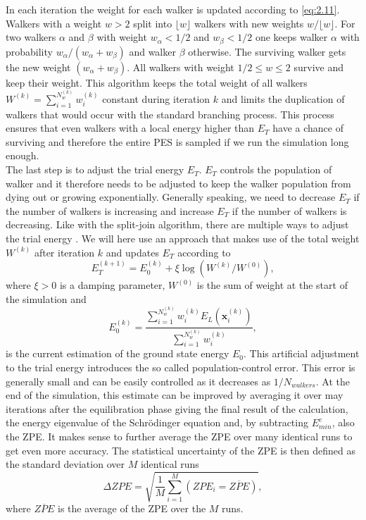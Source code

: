 \documentclass [12pt]{report}
\begin{document}
 In each iteration the weight for each walker is updated according to \eqref{eq:2.11}. Walkers with a weight $w > 2$ split into $\lfloor w \rfloor$ walkers with new weights $w/\lfloor w \rfloor$. For two walkers $\alpha$ and $\beta$ with weight $w_\alpha < 1/2$ and $w_\beta < 1/2$ one keeps walker $\alpha$  with probability $w_\alpha/(w_\alpha + w_\beta)$ and walker $\beta$ otherwise. The surviving walker gets the new weight $(w_\alpha + w_\beta)$. All walkers with weight $1/2 \leq w \leq 2$ survive and keep their weight. This algorithm keeps the total weight of all walkers $W^{(k)} =  \sum_{i = 1}^{N_w^{(k)}} w_i^{(k)}$ constant during iteration $k$ and limits the duplication of walkers that would occur with the standard branching process.
 This process ensures that even walkers with a local energy higher than $E_T$ have a chance of surviving and therefore the entire PES is sampled if we run the simulation long enough. \\
The last step is to adjust the trial energy $E_T$. $E_T$ controls the population of walker and it therefore needs to be adjusted to keep the walker population from dying out or growing exponentially. Generally speaking, we need to decrease $E_T$ if the number of walkers is increasing and increase $E_T$ if the number of walkers is decreasing.  Like with the split-join algorithm, there are multiple ways to adjust the trial energy \cite{mccoy,alavi}. We will here use an approach \cite{cyrus} that makes use of the total weight $W^{(k)}$ after iteration $k$ and updates $E_T$ according to
\begin{equation}\label{eq:2.12} 
E_T^{(k+1)} = E_0^{(k)} + \xi \log(W^{(k)}/W^{(0)}),
\end{equation}
where $\xi > 0$ is a damping parameter, $W^{(0)}$ is the sum of weight at the start of the simulation and
\begin{equation}\label{eq:2.13} 
E_0^{(k)} = \frac{\sum_{i = 1}^{N_w^{(k)}} w_{i}^{(k)} E_L(\bm{x}_{i}^{(k)})}{\sum_{i = 1}^{N_w^{(k)}} w_{i}^{(k)} },
\end{equation}
is the current estimation of the ground state energy $E_0$. This artificial adjustment to the trial energy introduces the so called population-control error. This error is generally small and can be easily controlled as it decreases as $1/N_{walkers}$. At the end of the simulation, this estimate can be improved by averaging it over may iterations after the equilibration phase giving the final result of the calculation, the energy eigenvalue of the Schrödinger equation and, by subtracting $E^e_{min}$, also the ZPE. It makes sense to further average the ZPE over many identical runs to get even more accuracy. The statistical uncertainty of the ZPE is then defined as the standard deviation over $M$ identical runs \cite{herleitung2}
\begin{equation}
\Delta ZPE = \sqrt{\frac{1}{M} \sum_{i=1}^M(ZPE_i = \overline{ZPE})},
\end{equation}
where $\overline{ZPE}$ is the average of the ZPE over the $M$ runs.
\newpage
\end{document}
